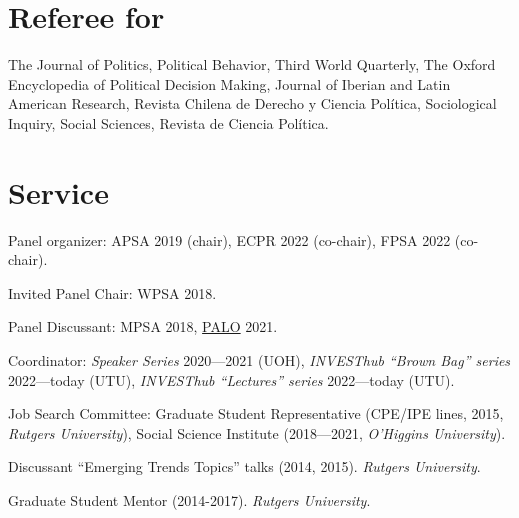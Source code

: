 \documentclass[letterpaper]{article}
\renewenvironment{itemize}{
  \begin{list}{}{
    \setlength{\leftmargin}{1.5em}
  }
}{
  \end{list}
}
\begin{document}

\section*{Referee for}
  \begin{itemize}
    \item[\textcolor{gray}{\textbullet}] The Journal of Politics, Political Behavior, Third World Quarterly, The Oxford Encyclopedia of Political Decision Making, Journal of Iberian and Latin American Research, Revista Chilena de Derecho y Ciencia Pol\'itica, Sociological Inquiry, Social Sciences, Revista de Ciencia Pol\'itica.
  \end{itemize}




\section*{Service}

\begin{itemize}
\item[\textcolor{gray}{\textbullet}] Panel organizer: APSA 2019 (chair), ECPR 2022 (co-chair), FPSA 2022 (co-chair).
\item[\textcolor{gray}{\textbullet}] Invited Panel Chair: WPSA 2018.
\item[\textcolor{gray}{\textbullet}] Panel Discussant: MPSA 2018, \href{https://paloresearch.fi/en/events/finalconference/}{PALO} 2021.
\item[\textcolor{gray}{\textbullet}] Coordinator: \emph{Speaker Series} 2020---2021 (UOH), \emph{INVESThub ``Brown Bag'' series} 2022---today (UTU), \emph{INVESThub ``Lectures'' series} 2022---today (UTU).
\item[\textcolor{gray}{\textbullet}] Job Search Committee: Graduate Student Representative (CPE/IPE lines, 2015, \emph{Rutgers University}), Social Science Institute (2018---2021, \emph{O'Higgins University}).
\item[\textcolor{gray}{\textbullet}] Discussant ``Emerging Trends Topics'' talks (2014, 2015). \emph{Rutgers University}.
\item[\textcolor{gray}{\textbullet}] Graduate Student Mentor (2014-2017). \emph{Rutgers University}.
\end{itemize}
\end{document}

